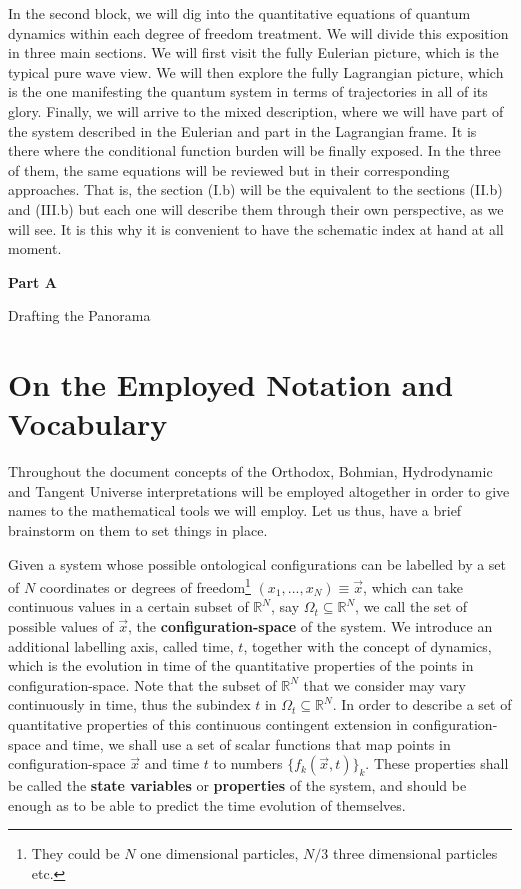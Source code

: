 \documentclass[11pt, a4paper]{article} %
\newcommand{\R}{\mathbb{R}} %
\newenvironment{kapituloBerria}[1][]
  {\clearpage           %
   \thispagestyle{empty}%
   \vspace*{\stretch{2}}%
   \raggedleft          %
   {\textbf{{\fontsize{60}{40}\selectfont \hspace{+9.5cm}#1\newline \newline}}}
   \bf
   \fontsize{30}{20}\selectfont
  }
  {\par %
   \vspace{\stretch{3}} %
   \clearpage           %
  }
\begin{document}
In the second block, we will dig into the quantitative equations of quantum dynamics within each degree of freedom treatment. We will divide this exposition in three main sections. We will first visit the fully Eulerian picture, which is the typical pure wave view. We will then explore the fully Lagrangian picture, which is the one manifesting the quantum system in terms of trajectories in all of its glory. Finally, we will arrive to the mixed description, where we will have part of the system described in the Eulerian and part in the Lagrangian frame. It is there where the conditional function burden will be finally exposed. In the three of them, the same equations will be reviewed but in their corresponding approaches. That is, the section (I.b) will be the equivalent to the sections (II.b) and (III.b) but each one will describe them through their own perspective, as we will see. It is this why it is convenient to have the schematic index at hand at all moment.

\newpage

\begin{kapituloBerria}[Part A]
Drafting the Panorama
\end{kapituloBerria}
\newpage
\null
\clearpage

\pagestyle{fancy}

\section*{On the Employed Notation and Vocabulary}

Throughout the document concepts of the Orthodox, Bohmian, Hydrodynamic and Tangent Universe interpretations will be employed altogether in order to give names to the mathematical tools we will employ. Let us thus, have a brief brainstorm on them to set things in place.

Given a system whose possible ontological configurations can be labelled by a set of $N$ coordinates or degrees of freedom\footnote{They could be $N$ one dimensional particles, $N/3$ three dimensional particles etc.} $(x_1, ...,x_N)\equiv \vec{x}$, which can take continuous values in a certain subset of $\R^N$, say $\Omega_t\subseteq \R^N$, we call the set of possible values of $\vec{x}$, the {\bf configuration-space} of the system. We introduce an additional labelling axis, called time, $t$, together with the concept of dynamics, which is the evolution in time of the quantitative properties of the points in configuration-space. Note that the subset of $\R^N$ that we consider may vary continuously in time, thus the subindex $t$ in $\Omega_t\subseteq \R^N$. In order to describe a set of quantitative properties of this continuous contingent extension in configuration-space and time, we shall use a set of scalar functions that map points in configuration-space $\vec{x}$ and time $t$ to numbers $\{f_k(\vec{x},t)\}_k$. These properties shall be called the {\bf state variables} or {\bf properties} of the system, and should be enough as to be able to predict the time evolution of themselves. 
\end{document}
